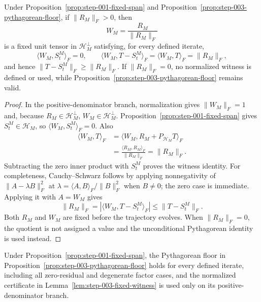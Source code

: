 \begin{lemma}\label{lem:step-003-fixed-witness}
Under Proposition~\ref{prop:step-001-fixed-span} and
Proposition~\ref{prop:step-003-pythagorean-floor}, if $\|R_M\|_F>0$, then
\[
 W_M=\frac{R_M}{\|R_M\|_F}
\]
is a fixed unit tensor in $\mathcal H_M^\perp$ satisfying, for every defined
iterate,
\[
 \langle W_M,S_t^M\rangle_F=0,
 \qquad
 \langle W_M,T-S_t^M\rangle_F
 =\langle W_M,T\rangle_F=\|R_M\|_F,
\]
and hence $\|T-S_t^M\|_F\ge\|R_M\|_F$.  If $\|R_M\|_F=0$, no normalized
witness is defined or used, while
Proposition~\ref{prop:step-003-pythagorean-floor} remains valid.
\end{lemma}

\begin{proof}
In the positive-denominator branch, normalization gives
$\|W_M\|_F=1$ and, because $R_M\in\mathcal H_M^\perp$,
$W_M\in\mathcal H_M^\perp$.  Proposition~\ref{prop:step-001-fixed-span}
gives $S_t^M\in\mathcal H_M$, so
$\langle W_M,S_t^M\rangle_F=0$.  Also
\[
 \begin{aligned}
 \langle W_M,T\rangle_F
 &=\langle W_M,R_M+P_{\mathcal H_M}T\rangle_F\\
 &=\frac{\langle R_M,R_M\rangle_F}{\|R_M\|_F}
 =\|R_M\|_F.
 \end{aligned}
\]
Subtracting the zero inner product with $S_t^M$ proves the witness identity.
For completeness, Cauchy--Schwarz follows by applying nonnegativity of
$\|A-\lambda B\|_F^2$ at
$\lambda=\langle A,B\rangle_F/\|B\|_F^2$ when $B\ne0$; the zero case is
immediate.  Applying it with $A=W_M$ gives
\[
 \|R_M\|_F
 =|\langle W_M,T-S_t^M\rangle_F|
 \le\|T-S_t^M\|_F.
\]
Both $R_M$ and $W_M$ are fixed before the trajectory evolves.  When
$\|R_M\|_F=0$, the quotient is not assigned a value and the unconditional
Pythagorean identity is used instead.
\end{proof}

\begin{proposition}\label{prop:step-003-certificate}
Under Proposition~\ref{prop:step-001-fixed-span}, the Pythagorean floor in
Proposition~\ref{prop:step-003-pythagorean-floor} holds for every defined
iterate, including all zero-residual and degenerate factor cases, and the
normalized certificate in Lemma~\ref{lem:step-003-fixed-witness} is used only
on its positive-denominator branch.
\end{proposition}

